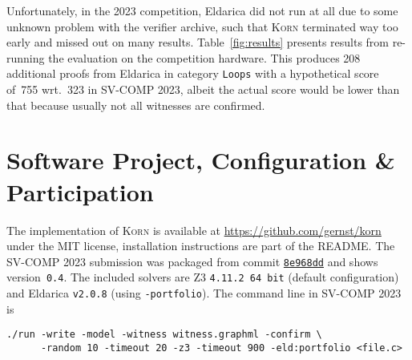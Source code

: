 \documentclass{llncs}
\newcommand{\Korn}{\textsc{Korn}\xspace}
\begin{document}
Unfortunately, in the 2023 competition,
Eldarica did not run at all due to some unknown problem with the verifier archive,
such that \Korn terminated way too early and missed out on many results.
Table~\ref{fig:results} presents results from re-running the evaluation on the competition hardware.
This produces 208 additional proofs from Eldarica
in category \texttt{Loops} with a hypothetical score of~755 wrt.~323 in SV-COMP 2023,
albeit the actual score would be lower than that because usually not all witnesses are confirmed.



\section{Software Project, Configuration \& Participation}
\label{sec:project}

The implementation of \Korn is available at
    \url{https://github.com/gernst/korn} under the MIT license,
installation instructions are part of the README.
The SV-COMP 2023 submission was packaged from commit
\href{https://github.com/gernst/korn/commit/8e968dd9e1498d358270d1e78d473befca8e63a8}{\tt 8e968dd}
and shows version~\texttt{0.4}.
The included solvers are Z3 \texttt{4.11.2 64 bit} (default configuration) and Eldarica \texttt{v2.0.8} (using \texttt{-portfolio}).
The command line in SV-COMP 2023 is
\begin{verbatim}
./run -write -model -witness witness.graphml -confirm \
      -random 10 -timeout 20 -z3 -timeout 900 -eld:portfolio <file.c>
\end{verbatim}
\end{document}
